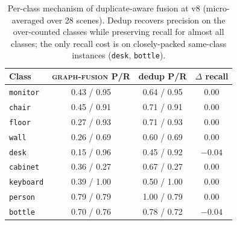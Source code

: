 \documentclass[runningheads]{llncs}
\begin{document}
\begin{table}[t]
\centering
\caption{Per-class mechanism of duplicate-aware fusion at v8 (micro-averaged over 28 scenes). Dedup
recovers precision on the over-counted classes while preserving recall for almost all classes; the only
recall cost is on closely-packed same-class instances (\texttt{desk}, \texttt{bottle}).}
\label{tab:dedup_mechanism}
\small
\begin{tabular}{lccc}
\toprule
Class & \textsc{graph-fusion} P/R & dedup P/R & $\Delta$ recall \\
\midrule
\texttt{monitor}  & 0.43 / 0.95 & 0.64 / 0.95 & $0.00$ \\
\texttt{chair}    & 0.45 / 0.91 & 0.71 / 0.91 & $0.00$ \\
\texttt{floor}    & 0.27 / 0.93 & 0.71 / 0.93 & $0.00$ \\
\texttt{wall}     & 0.26 / 0.69 & 0.60 / 0.69 & $0.00$ \\
\texttt{desk}     & 0.15 / 0.96 & 0.45 / 0.92 & $-0.04$ \\
\texttt{cabinet}  & 0.36 / 0.27 & 0.67 / 0.27 & $0.00$ \\
\texttt{keyboard} & 0.39 / 1.00 & 0.50 / 1.00 & $0.00$ \\
\texttt{person}   & 0.79 / 0.79 & 1.00 / 0.79 & $0.00$ \\
\texttt{bottle}   & 0.70 / 0.76 & 0.78 / 0.72 & $-0.04$ \\
\bottomrule
\end{tabular}
\end{table}

\begin{table}[t]
\centering
\caption{Uncertainty-aware fusion is a negative result. $\Delta$ \textsc{proposed} $-$
\textsc{graph-fusion} in object-label F1 (rank-normalized, $w{=}0.3$); W/L/T is per-scene over $n=28$.
A weight sweep over $[0.1, 0.8]$ contains no setting that beats the baseline.}
\label{tab:uncertainty_neg}
\small
{}
\end{table}
\end{document}
